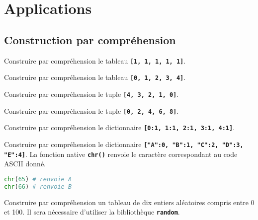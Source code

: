 \documentclass[a4paper,11pt]{article}
\begin{document}
\section{Applications}
\subsection{Construction par compréhension}
\begin{exo}
    Construire par compréhension le tableau \textbf{\texttt{[1, 1, 1, 1, 1]}}.
\end{exo}
\begin{exo}
    Construire par compréhension le tableau \textbf{\texttt{[0, 1, 2, 3, 4]}}.
\end{exo}
\begin{exo}
    Construire par compréhension le tuple \textbf{\texttt{[4, 3, 2, 1, 0]}}.
\end{exo}
\begin{exo}
    Construire par compréhension le tuple \textbf{\texttt{[0, 2, 4, 6, 8]}}.
\end{exo}
\begin{exo}
    Construire par compréhension le dictionnaire \textbf{\texttt{[0:1, 1:1, 2:1, 3:1, 4:1]}}.
\end{exo}
\begin{exo}
    Construire par compréhension le dictionnaire \textbf{\texttt{["A":0, "B":1, "C":2, "D":3, "E":4]}}. La fonction native \textbf{\texttt{chr()}} renvoie le caractère correspondant au code ASCII donné.
    \begin{lstlisting}[language=Python  , xleftmargin=2em, xrightmargin=2em]
chr(65) # renvoie A
chr(66) # renvoie B
\end{lstlisting}
\end{exo}
\begin{exo}
    Construire par compréhension un tableau de dix entiers aléatoires compris entre 0 et 100. Il sera nécessaire d'utiliser la bibliothèque \textbf{\texttt{random}}.
\end{exo}
\end{document}
